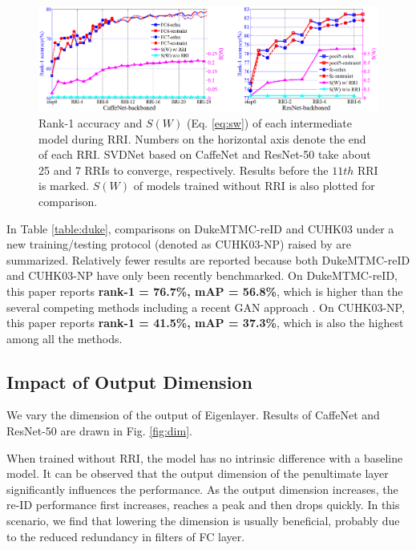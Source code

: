 \documentclass[10pt,twocolumn,letterpaper]{article}
\begin{document}
\begin{figure}[t]
\begin{center}
\includegraphics[width=0.9\linewidth]{RRI.png}
\end{center}
\setlength{\abovecaptionskip}{0cm}
   \caption{Rank-1 accuracy and $S(W)$ (Eq. \ref{eq:sw}) of each intermediate model during RRI. Numbers on the horizontal axis denote the end of each RRI. SVDNet based on CaffeNet and ResNet-50 take about 25 and 7 RRIs to converge, respectively. Results before the $11th$ RRI is marked. $S(W)$ of models trained without RRI is also plotted for comparison.}
\label{fig:RRI}
\end{figure}


In Table \ref{table:duke}, comparisons on DukeMTMC-reID and CUHK03 under a new training/testing protocol (denoted as CUHK03-NP) raised by \cite{DBLP:conf/cvpr/ZhongZCL17} are summarized. Relatively fewer results are reported because both DukeMTMC-reID and CUHK03-NP have only been recently benchmarked. On DukeMTMC-reID, this paper reports \textbf{rank-1 = 76.7\%, mAP = 56.8\%}, which is higher than the several competing methods including a recent GAN approach \cite{zheng2017unlabeled}. On CUHK03-NP, this paper reports \textbf{rank-1 = 41.5\%, mAP = 37.3\%}, which is also the highest among all the methods. 

\subsection{Impact of Output Dimension} \label{sec:dimension}
We vary the dimension of the output of Eigenlayer. Results of CaffeNet and ResNet-50 are drawn in Fig. \ref{fig:dim}.
 
When trained without RRI, the model has no intrinsic difference with a baseline model. It can be observed that the output dimension of the penultimate layer significantly influences the performance. As the output dimension increases, the re-ID performance first increases, reaches a peak and then drops quickly. In this scenario, we find that lowering the dimension is usually beneficial, probably due to the reduced redundancy in filters of FC layer. 
\end{document}
